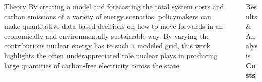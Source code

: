 \documentclass[final]{beamer}
\newlength{\sepwid}
\newlength{\onecolwid}
\newlength{\threecolwid}
\begin{document}
\begin{frame}[t]
\begin{columns}[t,totalwidth=\threecolwid]
\begin{column}{\onecolwid}
\begin{block}{Theory}
	By creating a model and forecasting the total system costs and carbon emissions of a variety of energy scenarios, policymakers can make quantitative data-based decisions on how to move forwards in an economically and environmentally sustainable way. By varying the contributions nuclear energy has to such a modeled grid, this work highlights the often underappreciated role nuclear plays in producing large quantities of carbon-free electricity across the state.


\end{block}



\end{column} %

\begin{column}{\sepwid}\end{column} %



\begin{column}{\onecolwid} %

\begin{block}{Results \& Analysis}
\vspace{0.7em}
\textbf{Costs}




\end{block}
\end{column}
\end{columns}
\end{frame}
\end{document}
